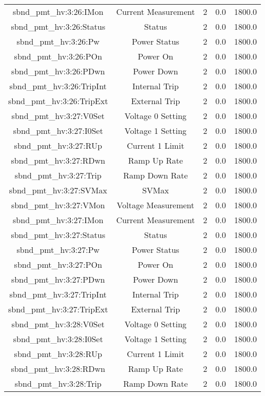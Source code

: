 \begin{table}[ptb]
\begin{tabular}{c | c c c c}
sbnd_pmt_hv:3:26:IMon & Current Measurement & 2 & 0.0 & 1800.0\\ 
sbnd_pmt_hv:3:26:Status & Status & 2 & 0.0 & 1800.0\\ 
sbnd_pmt_hv:3:26:Pw & Power Status & 2 & 0.0 & 1800.0\\ 
sbnd_pmt_hv:3:26:POn & Power On & 2 & 0.0 & 1800.0\\ 
sbnd_pmt_hv:3:26:PDwn & Power Down & 2 & 0.0 & 1800.0\\ 
sbnd_pmt_hv:3:26:TripInt & Internal Trip & 2 & 0.0 & 1800.0\\ 
sbnd_pmt_hv:3:26:TripExt & External Trip & 2 & 0.0 & 1800.0\\ 
sbnd_pmt_hv:3:27:V0Set & Voltage 0 Setting & 2 & 0.0 & 1800.0\\ 
sbnd_pmt_hv:3:27:I0Set & Voltage 1 Setting & 2 & 0.0 & 1800.0\\ 
sbnd_pmt_hv:3:27:RUp & Current 1 Limit & 2 & 0.0 & 1800.0\\ 
sbnd_pmt_hv:3:27:RDwn & Ramp Up Rate & 2 & 0.0 & 1800.0\\ 
sbnd_pmt_hv:3:27:Trip & Ramp Down Rate & 2 & 0.0 & 1800.0\\ 
sbnd_pmt_hv:3:27:SVMax & SVMax & 2 & 0.0 & 1800.0\\ 
sbnd_pmt_hv:3:27:VMon & Voltage Measurement & 2 & 0.0 & 1800.0\\ 
sbnd_pmt_hv:3:27:IMon & Current Measurement & 2 & 0.0 & 1800.0\\ 
sbnd_pmt_hv:3:27:Status & Status & 2 & 0.0 & 1800.0\\ 
sbnd_pmt_hv:3:27:Pw & Power Status & 2 & 0.0 & 1800.0\\ 
sbnd_pmt_hv:3:27:POn & Power On & 2 & 0.0 & 1800.0\\ 
sbnd_pmt_hv:3:27:PDwn & Power Down & 2 & 0.0 & 1800.0\\ 
sbnd_pmt_hv:3:27:TripInt & Internal Trip & 2 & 0.0 & 1800.0\\ 
sbnd_pmt_hv:3:27:TripExt & External Trip & 2 & 0.0 & 1800.0\\ 
sbnd_pmt_hv:3:28:V0Set & Voltage 0 Setting & 2 & 0.0 & 1800.0\\ 
sbnd_pmt_hv:3:28:I0Set & Voltage 1 Setting & 2 & 0.0 & 1800.0\\ 
sbnd_pmt_hv:3:28:RUp & Current 1 Limit & 2 & 0.0 & 1800.0\\ 
sbnd_pmt_hv:3:28:RDwn & Ramp Up Rate & 2 & 0.0 & 1800.0\\ 
sbnd_pmt_hv:3:28:Trip & Ramp Down Rate & 2 & 0.0 & 1800.0\\ 

\end{tabular}
\end{table}
